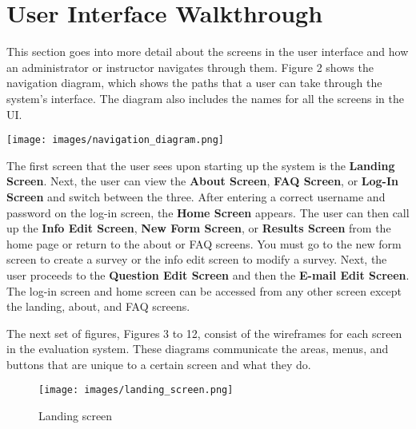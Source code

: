 \documentclass{article}
\begin{document}
\newpage

\section{User Interface Walkthrough}

This section goes into more detail about the screens in the user interface and how an administrator or instructor navigates through them. Figure 2 shows the navigation diagram, which shows the paths that a user can take through the system's interface. The diagram also includes the names for all the screens in the UI. 

\begin{center}
\vspace{3mm}
{\texttt{[image: images/navigation\_diagram.png]}}
\vspace{2mm}
\end{center} 

The first screen that the user sees upon starting up the system is the \textbf{Landing Screen}. Next, the user can view the \textbf{About Screen}, \textbf{FAQ Screen}, or  \textbf{Log-In Screen} and switch between the three. After entering a correct username and password on the log-in screen, the \textbf{Home Screen} appears. The user can then call up the \textbf{Info Edit Screen}, \textbf{New Form Screen}, or \textbf{Results Screen} from the home page or return to the about or FAQ screens. You must go to the new form screen to create a survey or the info edit screen to modify a survey. Next, the user proceeds to the \textbf{Question Edit Screen} and then the \textbf{E-mail Edit Screen}. The log-in screen and home screen can be accessed from any other screen except the landing, about, and FAQ screens.

The next set of figures, Figures 3 to 12, consist of the wireframes for each screen in the evaluation system. These diagrams communicate the areas, menus, and buttons that are unique to a certain screen and what they do.

\newpage
{}

\begin{center}
\begin{figure}[H]
    \centering
    \caption{Landing screen}
    \texttt{[image: images/landing\_screen.png]}
\end{figure}
\end{center}
\end{document}
